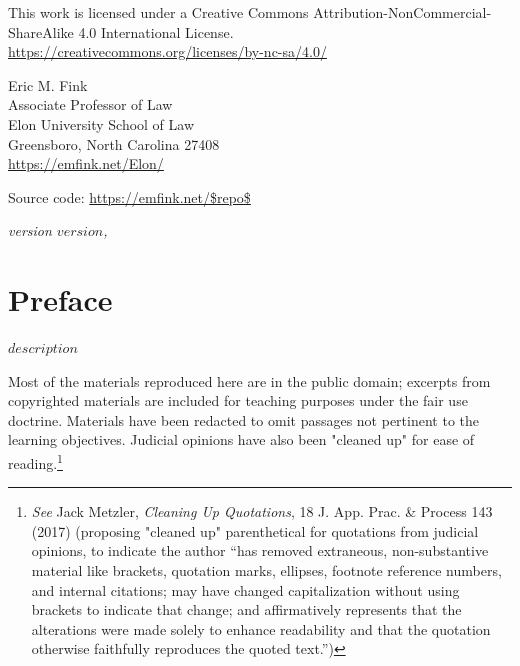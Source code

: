 \begin{small}
\raggedright{This work is licensed under a Creative Commons Attribution-NonCommercial-ShareAlike 4.0 International License.} \\
\url{https://creativecommons.org/licenses/by-nc-sa/4.0/}

\vspace{1em}

Eric M. Fink\\
Associate Professor of Law \\
Elon University School of Law \\
Greensboro, North Carolina 27408 \\
\url{https://emfink.net/Elon/}

\vspace{1em}

Source code: \url{https://emfink.net/$repo$}

\itshape{version $version$, \monthyear}

\end{small}
\endgroup

\clearpage


\thispagestyle{empty}

\vspace*{\fill}
\vspace*{\fill}

\chapter*{Preface}

{$description$}

Most of the materials reproduced here are in the public domain; excerpts from copyrighted materials are included for teaching purposes under the fair use doctrine. Materials have been redacted to omit passages not pertinent to the learning objectives. Judicial opinions have also been "cleaned up" for ease of reading.\footnote{\textit{See} Jack Metzler, {\textit{Cleaning Up Quotations}}, 18 J. App. Prac. \& Process 143 (2017) (proposing "cleaned up" parenthetical for quotations from judicial opinions, to indicate the author “has removed extraneous, non-substantive material like brackets, quotation marks, ellipses, footnote reference numbers, and internal citations; may have changed capitalization without using brackets to indicate that change; and affirmatively represents that the alterations were made solely to enhance readability and that the quotation otherwise faithfully reproduces the quoted text.”)} 